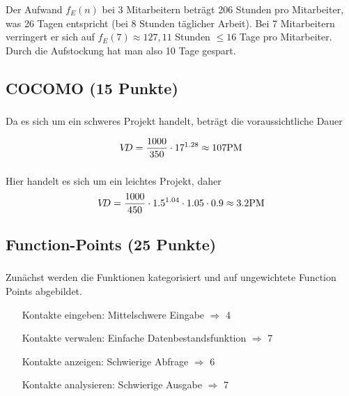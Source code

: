 \documentclass{scrartcl}
\begin{document}
Der Aufwand $f_E(n)$ bei 3 Mitarbeitern beträgt 206 Stunden pro Mitarbeiter, was
26 Tagen entspricht (bei 8 Stunden täglicher Arbeit).
Bei 7 Mitarbeitern verringert er sich auf $f_E(7)\approx 127,11$ Stunden $\le
16$ Tage pro Mitarbeiter. Durch die Aufstockung hat man also 10 Tage gespart.

\subsection{COCOMO (15 Punkte)}

\subsubsection{}

Da es sich um ein schweres Projekt handelt, beträgt die voraussichtliche Dauer

\begin{equation*}
   V\kern-3ptD = \frac{1000}{350} \cdot 17^{1.28} \approx 107 \text{PM}
\end{equation*}

\subsubsection{}

Hier handelt es sich um ein leichtes Projekt, daher
\begin{equation*}
   V\kern-3ptD = \frac{1000}{450} \cdot 1.5^{1.04} \cdot 1.05 \cdot 0.9 \approx 3.2 \text{PM}
\end{equation*}

\subsection{Function-Points (25 Punkte)}

\subsubsection{}
Zunächst werden die Funktionen kategorisiert und auf ungewichtete Function Points
abgebildet.

\begin{itemize}[font=\textbf,align=left]
   \item[Kontakte eingeben:] Mittelschwere Eingabe $\Rightarrow$ 4
   \item[Kontakte verwalen:] Einfache Datenbestandsfunktion $\Rightarrow$ 7
   \item[Kontakte anzeigen:] Schwierige Abfrage $\Rightarrow$ 6
   \item[Kontakte analysieren:] Schwierige Ausgabe $\Rightarrow$ 7
\end{itemize}
\end{document}
